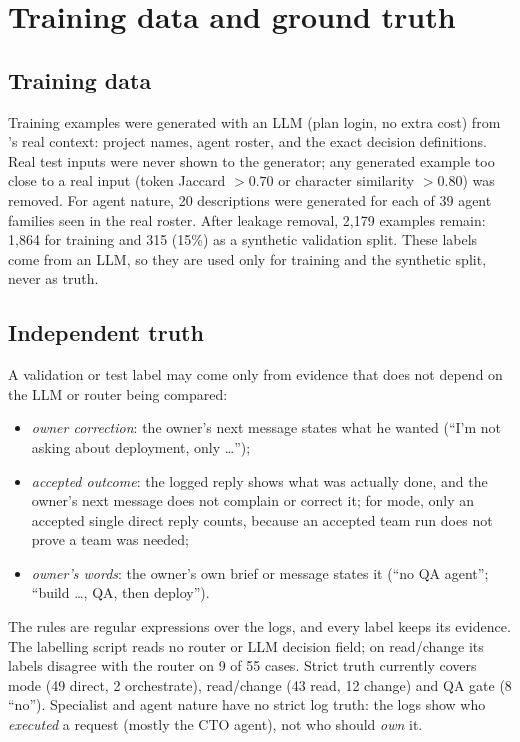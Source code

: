 \section{Training data and ground truth}\label{sec:truth}
\subsection{Training data}
Training examples were generated with an LLM (plan login, no extra cost) from \sys{}'s real context: project names, agent roster, and the exact decision definitions. Real test inputs were never shown to the generator; any generated example too close to a real input (token Jaccard $>0.70$ or character similarity $>0.80$) was removed. For agent nature, 20 descriptions were generated for each of 39 agent families seen in the real roster. After leakage removal, 2{,}179 examples remain: 1{,}864 for training and 315 (15\%) as a synthetic validation split. These labels come from an LLM, so they are used only for training and the synthetic split, never as truth.
\subsection{Independent truth}
A validation or test label may come only from evidence that does not depend on the LLM or router being compared:
\begin{itemize}
\item \emph{owner correction}: the owner's next message states what he wanted (``I'm not asking about deployment, only \ldots'');
\item \emph{accepted outcome}: the logged reply shows what was actually done, and the owner's next message does not complain or correct it; for mode, only an accepted single direct reply counts, because an accepted team run does not prove a team was needed;
\item \emph{owner's words}: the owner's own brief or message states it (``no QA agent''; ``build \ldots, QA, then deploy'').
\end{itemize}
The rules are regular expressions over the logs, and every label keeps its evidence. The labelling script reads no router or LLM decision field; on read/change its labels disagree with the router on 9 of 55 cases. Strict truth currently covers mode (49 direct, 2 orchestrate), read/change (43 read, 12 change) and QA gate (8 ``no''). Specialist and agent nature have no strict log truth: the logs show who \emph{executed} a request (mostly the CTO agent), not who should \emph{own} it.
